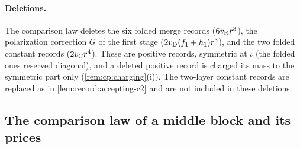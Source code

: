 \paragraph{Deletions.}
The comparison law deletes the six folded merge records
($6v_{\rm R}r^3$), the polarization correction $G$ of the first stage
($2v_{\rm D}(f_1+h_1)r^3$), and the two folded constant records
($2v_{\rm C}r^4$). These are positive records, symmetric at $\iota$
(the folded ones reserved diagonal), and a deleted positive record is
charged its mass to the symmetric part only
(\cref{rem:cp:charging}(i)). The two-layer constant records are replaced
as in \cref{lem:record:accepting-c2} and are not included in these deletions.

\subsection{The comparison law of a middle block and its prices}
\label{subsec:middle-comparison}

